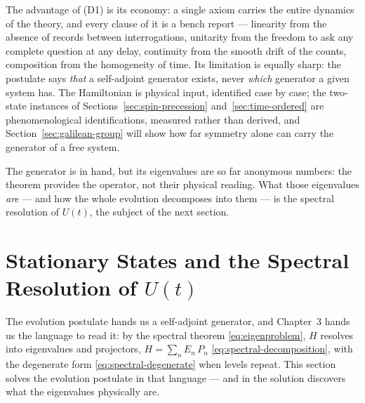The advantage of (D1) is its economy: a single axiom carries the entire dynamics of the theory, and every clause of it is a bench report --- linearity from the absence of records between interrogations, unitarity from the freedom to ask any complete question at any delay, continuity from the smooth drift of the counts, composition from the homogeneity of time. Its limitation is equally sharp: the postulate says \emph{that} a self-adjoint generator exists, never \emph{which} generator a given system has. The Hamiltonian is physical input, identified case by case; the two-state instances of Sections~\ref{sec:spin-precession} and~\ref{sec:time-ordered} are phenomenological identifications, measured rather than derived, and Section~\ref{sec:galilean-group} will show how far symmetry alone can carry the generator of a free system.

The generator is in hand, but its eigenvalues are so far anonymous numbers: the theorem provides the operator, not their physical reading. What those eigenvalues \emph{are} --- and how the whole evolution decomposes into them --- is the spectral resolution of $U(t)$, the subject of the next section.

\section{Stationary States and the Spectral Resolution of $U(t)$}
\label{sec:stationary-states}

The evolution postulate hands us a self-adjoint generator, and Chapter~3 hands us the language to read it: by the spectral theorem \eqref{eq:eigenproblem}, $H$ resolves into eigenvalues and projectors, $H = \sum_n E_n\,P_n$ \eqref{eq:spectral-decomposition}, with the degenerate form \eqref{eq:spectral-degenerate} when levels repeat. This section solves the evolution postulate in that language --- and in the solution discovers what the eigenvalues physically are.


